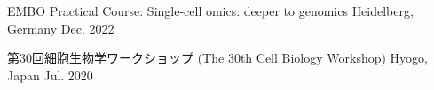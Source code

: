 
\vspace{-0.5em}
\begin{cvhonors}

  \cvworkshop
    {}
    {EMBO Practical Course: Single-cell omics: deeper to genomics} %
    {Heidelberg, Germany} %
    {Dec. 2022} %

  \cvworkshop
    {}
    {第30回細胞生物学ワークショップ (The 30th Cell Biology Workshop)} %
    {Hyogo, Japan} %
    {Jul. 2020} %

\end{cvhonors}


